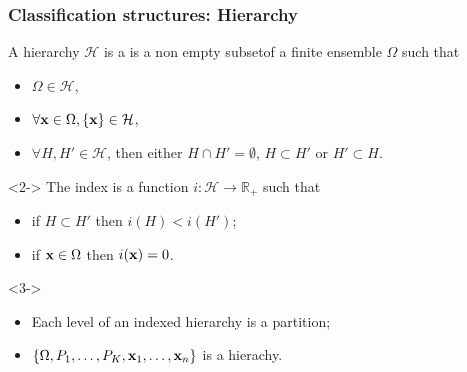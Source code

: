 \documentclass{beamer}\usepackage[]{graphicx}\usepackage[]{color}
\begin{document}
\begin{frame}
  \frametitle{Classification structures: Hierarchy}

  \begin{definition}[Hierarchy]
    A hierarchy $\mathcal{H}$ is a is a non empty subsetof a finite ensemble $\Omega$ such that
    \begin{itemize}
      \item $\Omega \in \mathcal{H}$,
      \item $\forall \mathbf{x} \in \Omega, \{\mathbf{x}\} \in \mathcal{H}$,
      \item $\forall H, H' \in \mathcal{H}$, then either $H \cap H' = \emptyset$, $H \subset H'$ or $H' \subset H$.
    \end{itemize}
  \end{definition}

  \vspace{-.15cm}

  \begin{definition}<2->
  The index is a function $i: \mathcal{H} \to \mathbb{R}_+$ such that  
    \begin{itemize}
      \item if $H \subset H'$ then $i(H) < i(H')$;
      \item if $\mathbf{x} \in \Omega$ then $i(\mathbf{x}) = 0$.
    \end{itemize}
  \end{definition}

  \vspace{-.15cm}

  \begin{properties}<3->
    \vspace{-.25cm}
    \begin{itemize}
      \item Each level of an indexed hierarchy is a partition;
      \item $\{\Omega, P_1, \dots, P_K, \mathbf{x}_1, \dots, \mathbf{x}_n\}$ is a hierachy.
    \end{itemize}
  \end{properties}
  
\end{frame}
\end{document}
